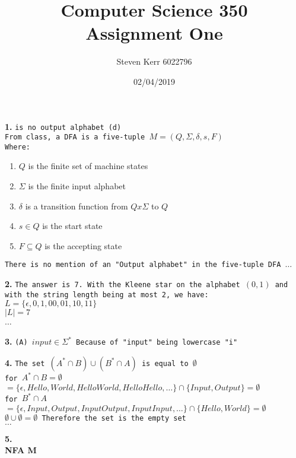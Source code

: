 \documentclass[a4paper,12pt]{article}
\title{Computer Science 350 \\
\large Assignment One}
\author{Steven Kerr 6022796}
\date{02/04/2019}
\begin{document}
\maketitle

\noindent \textbf{1.}
\texttt{is no output alphabet (d) \\
From class, a DFA is a five-tuple $M = (Q, \Sigma, \delta, s, F)$ \\
Where:}
\begin{enumerate}
	\item $Q$ is the finite set of machine states
	\item $\Sigma$ is the finite input alphabet
	\item $\delta$ is a transition function from $Q x \Sigma$ to $Q$
	\item $s \in Q$ is the start state
	\item $F \subseteq Q$ is the accepting state
\end{enumerate}
\texttt{There is no mention of an "Output alphabet" in the five-tuple DFA $\dots$ \newline}


\noindent \textbf{2.}
\texttt{The answer is 7. With the Kleene star on the alphabet $(0, 1)$ and with the string length being at most 2, we have: \\
$L=\{\epsilon, 0, 1, 00, 01, 10, 11\}$ \\
$|L|=7$\\ $\dots$ \newline}

\noindent \textbf{3.}
\texttt{(A) $input \in \Sigma^*$ Because of "input" being lowercase "i" \newline}

\noindent \textbf{4.}
\texttt{The set $(A^* \cap B) \cup (B^* \cap A)$ is equal to $\emptyset$ \\
for $A^* \cap B = \emptyset$\\
$=\{\epsilon, Hello, World, HelloWorld, HelloHello, \dots \} \cap \{Input, Output\} = \emptyset$ \\
for $B^* \cap A$ \\
$=\{\epsilon, Input, Output, InputOutput, InputInput, \dots \} \cap \{Hello, World\} = \emptyset$ \\
$\emptyset \cup \emptyset = \emptyset$ Therefore the set is the empty set \\ $\dots$ \\}

\noindent \textbf{5. \\}
\textbf{NFA M \\}
\end{document}
